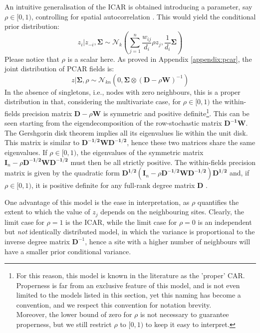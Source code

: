 \documentclass[openany, 11pt, oneside]{book}
\begin{document}
An intuitive generalisation of the ICAR is obtained introducing a parameter, say $ \rho \in [0, 1)$, controlling for spatial autocorrelation \parencite[][Chapter 10]{Banerjee}. This would yield the conditional prior distribution:
%
$$
z_i \vert z_{-i}, \boldsymbol{\Sigma} \sim \mathcal{N}_{k} \left(\sum_{j=1}^{n} \frac{w_{ij}}{d_i}\rho z_{j}, \frac{1}{d_i} \boldsymbol{\Sigma}\right)
$$
%
Please notice that $\rho$ is a scalar here. As proved in Appendix  \ref{appendix:pcar}, the joint distribution of PCAR fields is:
%
\begin{equation}
z\vert\boldsymbol{\Sigma}, \rho \sim \mathcal{N}_{k n} \left( 0, \boldsymbol{\Sigma} \otimes (\boldsymbol{D} - \rho \boldsymbol{W})^{-1}\right)
 \label{eq:pcar}
\end{equation}
%
In the absence of singletons, i.e., nodes with zero neighbours, this is a proper distribution in that, considering the multivariate case, for $\rho \in[0,1)$ the within-fields precision matrix $\boldsymbol{D}-\rho\boldsymbol{W}$ is symmetric and positive definite\footnote{For this reason, this model is known in the literature as the 'proper' CAR. Properness is far from an exclusive feature of this model, and is not even limited to the models listed in this section, yet this naming has become a convention, and we respect this convention for notation brevity. \\ Moreover, the lower bound of zero for $\rho$ is not necessary to guarantee properness, but we still restrict $\rho$ to $[0,1)$ to keep it easy to interpret.}. This can be seen starting from the eigendecomposition of the row-stochastic matrix $\boldsymbol{D^{-1}W}$. The Gershgorin disk theorem \parencite[][section 6.1]{HornJohnson} implies all its eigenvalues lie within the unit disk. This matrix is similar to $ \boldsymbol{D^{-1/2}WD^{-1/2}}$, hence these two matrices share the same eigenvalues. If $\rho \in [0,1)$, the eigenvalues of the symmetric matrix $\boldsymbol{I}_{n} - \rho \boldsymbol{D^{-1/2}WD^{-1/2}}$ must then be all strictly positive. The within-fields precision matrix is given by the quadratic form $\boldsymbol{D^{1/2}} \left(\boldsymbol{I}_{n} - \rho \boldsymbol{D^{-1/2}WD^{-1/2}} \right)\boldsymbol{D^{1/2}}$ and, if $\rho \in[0,1)$, it is positive definite for any full-rank degree matrix $\boldsymbol{D}$ \cite[see also][Observation 7.1.8]{HornJohnson}.

One advantage of this model is the ease in interpretation, as $\rho$ quantifies the extent to which the value of $z_j$ depends on the neighbouring sites. Clearly, the limit case for $\rho = 1$ is the ICAR, while the limit case for $\rho = 0$ is an independent but \textit{not} identically distributed model, in which the variance is proportional to the inverse degree matrix $\boldsymbol{D}^{-1}$, hence a site with a higher number of neighbours will have a smaller prior conditional variance.
\end{document}
